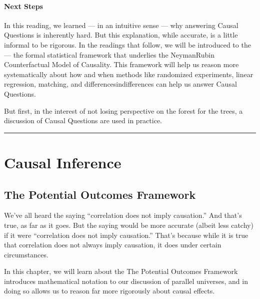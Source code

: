\documentclass[letterpaper,10pt,english]{jupyterBook}
\begin{document}
\subsection{Next Steps}
\label{\detokenize{30_questions/40_answering_causal_questions:next-steps}}
\sphinxAtStartPar
In this reading, we learned — in an intuitive sense — why answering Causal Questions is inherently hard. But this explanation, while accurate, is a little informal to be rigorous. In the readings that follow, we will be introduced to the  — the formal statistical framework that underlies the Neyman\sphinxhyphen{}Rubin Counterfactual Model of Causality. This framework will help us reason more systematically about how and when methods like randomized experiments, linear regression, matching, and differences\sphinxhyphen{}in\sphinxhyphen{}differences can help us answer Causal Questions.

\sphinxAtStartPar
But first, in the interest of not losing perspective on the forest for the trees, a discussion of  Causal Questions are used in practice.


\bigskip\hrule\bigskip


\sphinxstepscope


\part{Causal Inference}

\sphinxstepscope


\chapter{The Potential Outcomes Framework}
\label{\detokenize{35_causal/10_potential_outcomes:the-potential-outcomes-framework}}\label{\detokenize{35_causal/10_potential_outcomes::doc}}
\sphinxAtStartPar
We’ve all heard the saying “correlation does not imply causation.” And that’s true, as far as it goes. But the saying would be more accurate (albeit less catchy) if it were “correlation does not  imply causation.” That’s because while it is true that correlation does not always imply causation, it does under certain circumstances.

\sphinxAtStartPar
In this chapter, we will learn about the  The Potential Outcomes Framework introduces mathematical notation to our discussion of parallel universes, and in doing so allows us to reason far more rigorously about causal effects.
\end{document}
